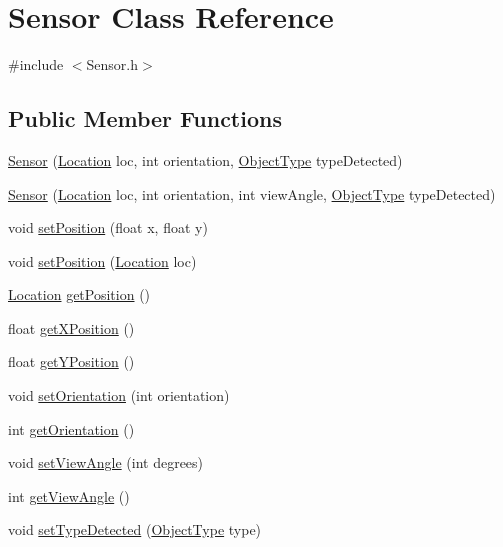 \hypertarget{classSensor}{\section{Sensor Class Reference}
\label{classSensor}
}


{\ttfamily \#include $<$Sensor.\-h$>$}

\subsection*{Public Member Functions}
\begin{DoxyCompactItemize}
\item 
\hyperlink{classSensor_a37f7683054a1cd9ea12834b702d8886d}{Sensor} (\hyperlink{structLocation}{Location} loc, int orientation, \hyperlink{PhysicalObject_8h_a842c5e2e69277690b064bf363c017980}{Object\-Type} type\-Detected)
\item 
\hyperlink{classSensor_a8db2f6b1569016548b226725e4eb3301}{Sensor} (\hyperlink{structLocation}{Location} loc, int orientation, int view\-Angle, \hyperlink{PhysicalObject_8h_a842c5e2e69277690b064bf363c017980}{Object\-Type} type\-Detected)
\item 
void \hyperlink{classSensor_addabbd59236833da1adfe341e4c18f80}{set\-Position} (float x, float y)
\item 
void \hyperlink{classSensor_ab177881093c0f4dc22f5951f27638c86}{set\-Position} (\hyperlink{structLocation}{Location} loc)
\item 
\hyperlink{structLocation}{Location} \hyperlink{classSensor_a021d0c08cc8cdf5d7eae9b58af02589f}{get\-Position} ()
\item 
float \hyperlink{classSensor_a32aadaf1e0c393eea51ee54df853cd7b}{get\-X\-Position} ()
\item 
float \hyperlink{classSensor_a87d42b5670accfc0dff1abc438875a73}{get\-Y\-Position} ()
\item 
void \hyperlink{classSensor_ae496cb993bf7c3b4876527a36ae95272}{set\-Orientation} (int orientation)
\item 
int \hyperlink{classSensor_a178e33bafb97b61319f17325223cf7de}{get\-Orientation} ()
\item 
void \hyperlink{classSensor_ad2138006b3d6a7779b17fd84e5a6f081}{set\-View\-Angle} (int degrees)
\item 
int \hyperlink{classSensor_ab5bc3039acc0d11c9cefb08515452aff}{get\-View\-Angle} ()
\item 
void \hyperlink{classSensor_a10ab10a83beb503b30a3a950149a2da9}{set\-Type\-Detected} (\hyperlink{PhysicalObject_8h_a842c5e2e69277690b064bf363c017980}{Object\-Type} type)

\end{DoxyCompactItemize}
